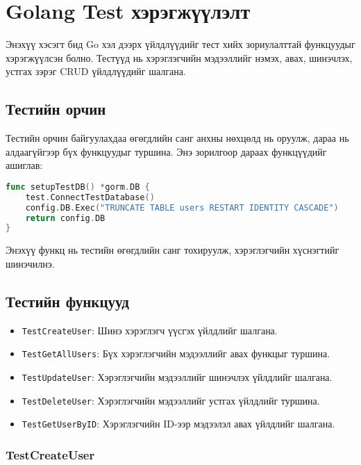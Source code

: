\section{Golang Test хэрэгжүүлэлт}

Энэхүү хэсэгт бид Go хэл дээрх үйлдлүүдийг тест хийх зориулалттай функцуудыг хэрэгжүүлсэн болно. Тестүүд нь хэрэглэгчийн мэдээллийг нэмэх, авах, шинэчлэх, устгах зэрэг CRUD үйлдлүүдийг шалгана.



\subsection{Тестийн орчин}

Тестийн орчин байгуулахдаа өгөгдлийн санг анхны нөхцөлд нь оруулж, дараа нь алдаагүйгээр бүх функцуудыг туршина. Энэ зорилгоор дараах функцүүдийг ашиглав:

\begin{lstlisting}[language=Go, caption=Test Database Setup, frame=single]
func setupTestDB() *gorm.DB {
    test.ConnectTestDatabase()
    config.DB.Exec("TRUNCATE TABLE users RESTART IDENTITY CASCADE") 
    return config.DB
}
\end{lstlisting}

Энэхүү функц нь тестийн өгөгдлийн санг тохируулж, хэрэглэгчийн хүснэгтийг шинэчилнэ.

\subsection{Тестийн функцууд}

\begin{itemize}
    \item \texttt{TestCreateUser}: Шинэ хэрэглэгч үүсгэх үйлдлийг шалгана.
    \item \texttt{TestGetAllUsers}: Бүх хэрэглэгчийн мэдээллийг авах функцыг туршина.
    \item \texttt{TestUpdateUser}: Хэрэглэгчийн мэдээллийг шинэчлэх үйлдлийг шалгана.
    \item \texttt{TestDeleteUser}: Хэрэглэгчийн мэдээллийг устгах үйлдлийг туршина.
    \item \texttt{TestGetUserByID}: Хэрэглэгчийн ID-ээр мэдээлэл авах үйлдлийг шалгана.
\end{itemize}

\subsubsection{TestCreateUser}

